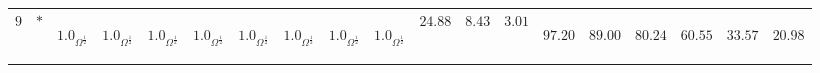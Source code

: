 \documentclass[twocolumn]{article}
\begin{document}
\begin{table}[t]
\begin{tabular}{|l|l|llllllll|lll|llllll|}
	$9$ &	$\ast $	&  \begin{sideways}$1.0_{\Omega^{\frac{1}{2}}}$\end{sideways}& \begin{sideways}$1.0_{\Omega^{\frac{1}{2}}}$\end{sideways}& \begin{sideways}$1.0_{\Omega^{\frac{1}{2}}}$\end{sideways}& \begin{sideways}$1.0_{\Omega^{\frac{1}{2}}}$\end{sideways}& \begin{sideways}$1.0_{\Omega^{\frac{1}{2}}}$\end{sideways}& \begin{sideways}$1.0_{\Omega^{\frac{1}{2}}}$\end{sideways}& \begin{sideways}$1.0_{\Omega^{\frac{1}{2}}}$\end{sideways} &\begin{sideways}$1.0_{\Omega^{\frac{1}{2}}}$\end{sideways}&  $24.88 $&$ 8.43 $& $ 3.01 $& \begin{sideways}$97.20$\end{sideways}& \begin{sideways}$89.00$\end{sideways}&\begin{sideways}$ 80.24$\end{sideways}&\begin{sideways}$ 60.55$\end{sideways}& \begin{sideways}$33.57$ \end{sideways}& \begin{sideways}$20.98$\end{sideways} \\

\end{tabular}
\end{table}
\end{document}
